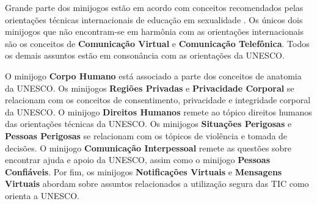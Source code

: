 Grande parte dos minijogos estão em acordo com conceitos recomendados pelas orientações técnicas internacionais de educação em sexualidade \cite{women2018international}. Os únicos dois minijogos que não encontram-se em harmônia com as orientações internacionais são os conceitos de \textbf{Comunicação Virtual} e \textbf{Comunicação Telefônica}. Todos os demais assuntos estão em consonância com as orientações da UNESCO.

O  minijogo \textbf{Corpo Humano} está associado a parte dos conceitos de anatomia da UNESCO. Os minijogos \textbf{Regiões Privadas} e \textbf{Privacidade Corporal} se relacionam com os conceitos de consentimento, privacidade e integridade corporal da UNESCO. O minijogo \textbf{Direitos Humanos} remete ao tópico direitos humanos das orientações técnicas da UNESCO. Os minijogos \textbf{Situações Perigosas} e \textbf{Pessoas Perigosas} se relacionam com os tópicos de violência e tomada de decisões. O minijogo \textbf{Comunicação Interpessoal} remete as questões sobre encontrar ajuda e apoio da UNESCO, assim como o minijogo \textbf{Pessoas Confiáveis}. Por fim, os minijogos \textbf{Notificações Virtuais} e \textbf{Mensagens Virtuais} abordam sobre assuntos relacionados a utilização segura das TIC como orienta a UNESCO. 














